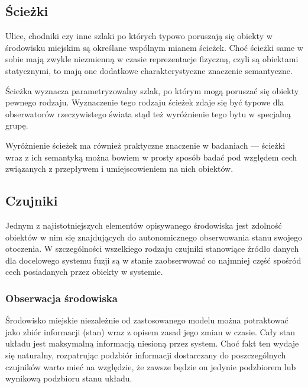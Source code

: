 \subsection{Ścieżki}
\par{
Ulice, chodniki czy inne szlaki po których typowo poruszają się obiekty w środowisku miejskim są określane wspólnym mianem ścieżek. Choć ścieżki same w sobie mają zwykle niezmienną w czasie reprezentacje fizyczną, czyli są obiektami statycznymi, to mają one dodatkowe charakterystyczne znaczenie semantyczne.
}
\par{
Ścieżka wyznacza parametryzowalny szlak, po którym mogą poruszać się obiekty pewnego rodzaju. Wyznaczenie tego rodzaju ścieżek zdaje się być typowe dla obserwatorów rzeczywistego świata stąd też wyróżnienie tego bytu w specjalną grupę.
}
\par{
Wyróżnienie ścieżek ma również praktyczne znaczenie w badaniach --- ścieżki wraz z ich semantyką można bowiem w prosty sposób badać pod względem cech związanych z przepływem i umiejscowieniem na nich obiektów.
}
\subsection{Czujniki}
\par{
Jednym z najistotniejszych elementów opisywanego środowiska jest zdolność obiektów w nim się znajdujących do autonomicznego obserwowania stanu swojego otoczenia. W szczególności wszelkiego rodzaju czujniki stanowiące źródło danych dla docelowego systemu fuzji są w stanie zaobserwować co najmniej część  spośród cech posiadanych przez obiekty w systemie.
}

\subsubsection{Obserwacja środowiska}
\par{
Środowisko miejskie niezależnie od zastosowanego modelu można potraktować jako zbiór informacji (stan) wraz z opisem zasad jego zmian w czasie. Cały stan układu jest maksymalną informacją niesioną przez system. Choć fakt ten wydaje się naturalny, rozpatrując podzbiór informacji dostarczany do poszczególnych czujników warto mieć na względzie, że zawsze będzie on jedynie podzbiorem lub wynikową podzbioru stanu układu.
}

